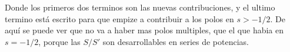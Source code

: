 Donde los primeros dos terminos son las nuevas contribuciones, y el ultimo termino está escrito para que empize a contribuir a los polos en  $s > -1/2$. De aquí se puede ver que no va a haber mas polos multiples, que el que habia en $s=-1/2$, porque las $S / S' $ son desarrollables en series de potencias.


\begin{comment}
Las primeras 3 integrales se pueden realizar analiticamente de manera sencilla, dado que son todas series de potencias, la integral angular va a tener que ser evaluada numericamente dado que es de la forma (parametrizando $\lambda = e ^{i \theta}$ y llamando $M_c$ a todo el termino adentro del logaritmo) :

\begin{equation}
\begin{array}{c}

\frac{1}{2 \pi i} \int _{\pi /2 } ^{- \pi /2} 
\frac{e ^{-2 s i \theta} d \theta}{M [e ^{i \theta}]} \\

\Bigg[

\frac{
e ^{- \frac{i \alpha (Log[2 L] + i \theta)}{2 e ^{i \theta} }} e ^{2 i L e ^{i \theta}}
}{\Gamma \left( 1 - \frac{i \alpha}{2 e ^{i \theta}} \right)}
	\left(
		\left(
			2 i L -
			\frac{i \alpha}{2 e ^{2 i \theta} } + 
			\frac{i \alpha( Log[2 L ] + e ^{i \theta} ) }{2 e^{2 i \theta}}
			- \frac{i \alpha \psi \left( 1 - \frac{i \alpha}{2 e ^{i \theta}}\right)}
				   {2 e ^{2 i \theta}}
			\right) S1 [e ^{i \theta}] +
		S1 ' [e ^{i \theta }]
		\right)
  \\

- \frac{
e ^{ \frac{i \alpha (Log[2 L] + i \theta)}{2 e ^{i \theta} }}
}{\Gamma \left( 1 + \frac{i \alpha}{2 e ^{i \theta}} \right)}
	\left(
		\left(
			\frac{i \alpha}{2 e ^{2 i \theta} } - 
			\frac{i \alpha( Log[2 L ] + e ^{i \theta} ) }{2 e^{2 i \theta}}
			+ \frac{i \alpha \psi \left( 1 + \frac{i \alpha}{2 e ^{i \theta}}\right)}
				   {2 e ^{2 i \theta}}
			\right) S2 [e ^{i \theta}] +
		S'2 [e ^{i \theta }]
		\right)


\Bigg]

\end{array}
\end{equation}

La cual va a dar una constante independiente de $\lambda$ y se puede calcular numericamente.



\end{comment}
